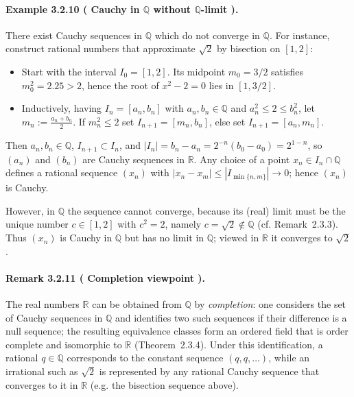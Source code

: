 \documentclass[12pt]{article}
\newcommand{\Q}{\mathbb{Q}}
\newcommand{\R}{\mathbb{R}}
\newcommand{\NumberedRemark}[3]{%
\paragraph*{Remark #1 ( #2 ).} #3\par}
\newcommand{\NumberedExample}[3]{%
\paragraph*{Example #1 ( #2 ).} #3\par}
\begin{document}
\NumberedExample{3.2.10}{Cauchy in $\Q$ without $\Q$-limit}{There exist Cauchy sequences in $\Q$ which do not converge in $\Q$. For instance, construct rational numbers that approximate $\sqrt{2}$ by bisection on $[1,2]$:
\begin{itemize}[leftmargin=*]
	\item Start with the interval $I_0=[1,2]$. Its midpoint $m_0=3/2$ satisfies $m_0^2=2.25>2$, hence the root of $x^2-2=0$ lies in $[1,3/2]$.
	\item Inductively, having $I_n=[a_n,b_n]$ with $a_n,b_n\in\Q$ and $a_n^2\le 2\le b_n^2$, let $m_n:=\tfrac{a_n+b_n}{2}$. If $m_n^2\le 2$ set $I_{n+1}=[m_n,b_n]$, else set $I_{n+1}=[a_n,m_n]$.
\end{itemize}
Then $a_n,b_n\in\Q$, $I_{n+1}\subset I_n$, and $|I_n|=b_n-a_n=2^{-n}(b_0-a_0)=2^{1-n}$, so $(a_n)$ and $(b_n)$ are Cauchy sequences in $\R$. Any choice of a point $x_n\in I_n\cap\Q$ defines a rational sequence $(x_n)$ with $|x_n-x_m|\le |I_{\min\{n,m\}}|\to 0$; hence $(x_n)$ is Cauchy.

However, in $\Q$ the sequence cannot converge, because its (real) limit must be the unique number $c\in[1,2]$ with $c^2=2$, namely $c=\sqrt{2}\notin\Q$ (cf. Remark~2.3.3). Thus $(x_n)$ is Cauchy in $\Q$ but has no limit in $\Q$; viewed in $\R$ it converges to $\sqrt{2}$.}

\NumberedRemark{3.2.11}{Completion viewpoint}{The real numbers $\R$ can be obtained from $\Q$ by \emph{completion}: one considers the set of Cauchy sequences in $\Q$ and identifies two such sequences if their difference is a null sequence; the resulting equivalence classes form an ordered field that is order complete and isomorphic to $\R$ (Theorem~2.3.4). Under this identification, a rational $q\in\Q$ corresponds to the constant sequence $(q,q,\dots)$, while an irrational such as $\sqrt{2}$ is represented by any rational Cauchy sequence that converges to it in $\R$ (e.g. the bisection sequence above).}
\end{document}
